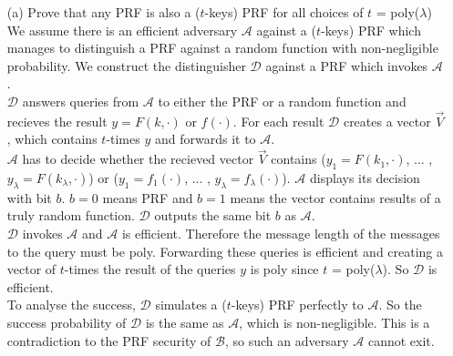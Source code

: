 \begin{itemize}
\item [(a)]
	Prove that any PRF is also a (\(t\)-keys) PRF for all choices of \(t\) = poly(\(\lambda\)) \\
	We assume there is an efficient adversary \(\mathcal{A}\) against a (\(t\)-keys) PRF which manages to distinguish a PRF against a random function with non-negligible probability. We construct the distinguisher \(\mathcal{D}\) against a PRF which invokes \(\mathcal{A}\).\\
	\(\mathcal{D}\) answers queries from \(\mathcal{A}\) to either the PRF or a random function and recieves the result \(y = F(k,\cdot)\) or \(f(\cdot)\). For each result \(\mathcal{D}\) creates a vector \(\vec{V}\), which contains \(t\)-times \(y\) and forwards it to \(\mathcal{A}\). \\
	\(\mathcal{A}\) has to decide whether the recieved vector \(\vec{V}\) contains (\(y_1 = F(k_1,\cdot)\), ... , \(y_\lambda = F(k_\lambda,\cdot)\)) or (\(y_1 = f_1 (\cdot)\), ... , \(y_\lambda = f_\lambda (\cdot)\)). \(\mathcal{A}\) displays its decision with bit \(b\). \(b = 0\) means PRF and  \(b = 1\) means the vector contains results of a truly random function. \(\mathcal{D}\) outputs the same bit \(b\) as \(\mathcal{A}\). \\
	\(\mathcal{D}\) invokes \(\mathcal{A}\) and \(\mathcal{A}\) is efficient. Therefore the message length of the messages to the query must be poly. Forwarding these queries is efficient and creating a vector of \(t\)-times the result of the queries \(y\) is poly since 
 \(t\) = poly(\(\lambda\)).  So \(\mathcal{D}\) is efficient.\\
	To analyse the success, \(\mathcal{D}\) simulates a (\(t\)-keys) PRF perfectly to \(\mathcal{A}\). So the success probability of \(\mathcal{D}\) is the same as \(\mathcal{A}\), which is non-negligible. This is a contradiction to the PRF security of \(\mathcal{B}\), so such an adversary \(\mathcal{A}\) cannot exit. \\


\end{itemize}
